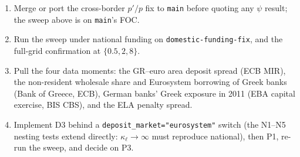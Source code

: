 \documentclass[11pt]{article}
\newcommand{\code}[1]{\texttt{\small #1}}
\begin{document}
\begin{enumerate}
\item Merge or port the cross-border $p'/p$ fix to \code{main} before quoting any $\psi$ result;
the sweep above is on \code{main}'s FOC.
\item Run the sweep under national funding on \code{domestic-funding-fix}, and the full-grid
confirmation at $\{0.5,2,8\}$.
\item Pull the four data moments: the GR--euro area deposit spread (ECB MIR), the non-resident
wholesale share and Eurosystem borrowing of Greek banks (Bank of Greece, ECB), German banks'
Greek exposure in 2011 (EBA capital exercise, BIS CBS), and the ELA penalty spread.
\item Implement D3 behind a \code{deposit\_market="eurosystem"} switch (the N1--N5 nesting tests
extend directly: $\kappa_\ell\to\infty$ must reproduce national), then P1, re-run the sweep, and
decide on P3.
\end{enumerate}
\end{document}
